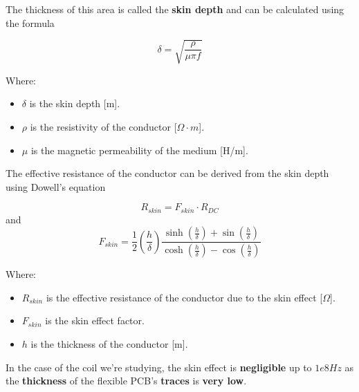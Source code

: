 \begin{itemize}
    \begin{samepage}
        The thickness of this area is called the \textbf{skin depth} and can be calculated using the formula
        \nopagebreak

        \begin{equation*}
            \delta = \sqrt{\frac{\rho}{\mu \pi f}}
        \end{equation*}
        \nopagebreak
                
        Where:
        \nopagebreak

        \begin{itemize}
            \item \( \delta \) is the skin depth [m].
            \item \( \rho \) is the resistivity of the conductor [\(\Omega \cdot m\)].
            \item \( \mu \) is the magnetic permeability of the medium [H/m].
        \end{itemize}
    \end{samepage}
    
    
    \begin{samepage}
        The effective resistance of the conductor can be derived from the skin depth using Dowell's equation \cite{AC_res_coils}
        \nopagebreak

        \begin{equation*}
            R_{skin} = F_{skin} \cdot R_{DC}
        \end{equation*}
        and
        \begin{equation*}
            F_{skin} = \frac{1}{2} (\frac{h}{\delta}) \frac{\sinh(\frac{h}{\delta}) + \sin(\frac{h}{\delta})}{\cosh(\frac{h}{\delta}) - \cos(\frac{h}{\delta})}
        \end{equation*}

        Where:
        \begin{itemize}
            \item \( R_{skin} \) is the effective resistance of the conductor due to the skin effect [\(\Omega\)].
            \item \( F_{skin} \) is the skin effect factor.
            \item \( h \) is the thickness of the conductor [m].
        \end{itemize}
    \end{samepage}

    \begin{samepage}
        In the case of the coil we're studying, the skin effect is \textbf{negligible} up to $1e8 Hz$ as the \textbf{thickness} of the flexible PCB's \textbf{traces} is \textbf{very low}.
        \nopagebreak


\end{samepage}
\end{itemize}

